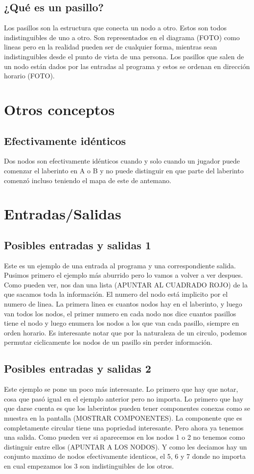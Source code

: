 \documentclass[conference]{IEEEtran}
\begin{document}
\subsection{¿Qué es un pasillo?}
Los pasillos son la estructura que conecta un nodo a otro. Estos son todos indistinguibles de uno a otro.
Son representados en el diagrama (FOTO) como lineas pero en la realidad pueden ser de cualquier forma, mientras sean indistinguibles
desde el punto de vista de una persona.
Los pasillos que salen de un nodo están dados por las entradas al programa y estos se ordenan en dirección horario (FOTO).


\section{Otros conceptos}

\subsection{Efectivamente idénticos}
Dos nodos son efectivamente idénticos cuando y solo cuando un jugador puede comenzar el laberinto en A o B y no puede distinguir en que parte del laberinto comenzó incluso teniendo el mapa de este de antemano.

\section{Entradas/Salidas}

\subsection{Posibles entradas y salidas 1}
Este es un ejemplo de una entrada al programa y una correspondiente salida. Pusimos primero el ejemplo más aburrido pero lo vamos a volver a ver despues.
Como pueden ver, nos dan una lista (APUNTAR AL CUADRADO ROJO) de la que sacamos toda la información. El numero del nodo está implicito por el numero de linea. La primera linea es cuantos nodos hay en el laberinto, y luego van todos los nodos, el primer numero en cada nodo nos dice cuantos pasillos tiene el nodo
y luego enumera los nodos a los que van cada pasillo, siempre en orden horario. Es interesante notar que por la naturaleza de un circulo, podemos permutar ciclicamente los nodos de un pasillo sin perder información.

\subsection{Posibles entradas y salidas 2}
Este ejemplo se pone un poco más interesante. Lo primero que hay que notar, cosa que pasó igual en el ejemplo anterior pero no importa. Lo primero que hay que darse cuenta es que los laberintos pueden tener componentes conexas como se muestra en la pantalla (MOSTRAR COMPONENTES). La componente que es completamente circular tiene una popriedad interesante. Pero ahora ya tenemos una salida. Como pueden ver si aparecemos en los nodos 1 o 2 no tenemos como distinguir entre ellos (APUNTAR A LOS NODOS). Y como les deciamos hay un conjunto maximo de nodos efectivamente identicos, el 5, 6 y 7 donde no importa en cual empezamos los 3 son indistinguibles de los otros.
\end{document}

